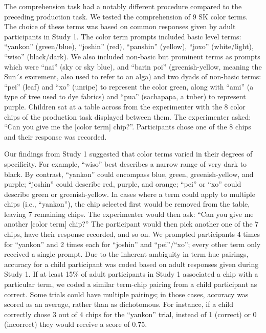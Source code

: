 \documentclass[
  ,apa7,floatsintext]{apa6}
\begin{document}
The comprehension task had a notably different procedure compared to the preceding production task. We tested the comprehension of 9 SK color terms. The choice of these terms was based on common responses given by adult participants in Study 1. The color term prompts included basic level terms: ``yankon'' (green/blue), ``joshin'' (red), ``panshin'' (yellow), ``joxo'' (white/light), ``wiso'' (black/dark). We also included non-basic but prominent terms as prompts which were ``nai'' (sky or sky blue), and ``barin poi'' (greenish-yellow, meaning the Sun´s excrement, also used to refer to an alga) and two dyads of non-basic terms: ``pei'' (leaf) and ``xo'' (unripe) to represent the color green, along with ``ami'' (a type of tree used to dye fabrics) and ``pua'' (sachapapa, a tuber) to represent purple. Children sat at a table across from the experimenter with the 8 color chips of the production task displayed between them. The experimenter asked: ``Can you give me the {[}color term{]} chip?''. Participants chose one of the 8 chips and their response was recorded.

Our findings from Study 1 suggested that color terms varied in their degrees of specificity. For example, ``wiso'' best describes a narrow range of very dark to black. By contrast, ``yankon'' could encompass blue, green, greenish-yellow, and purple; ``joshin'' could describe red, purple, and orange; ``pei'' or ``xo'' could describe green or greenish-yellow. In cases where a term could apply to multiple chips (i.e., ``yankon''), the chip selected first would be removed from the table, leaving 7 remaining chips. The experimenter would then ask: ``Can you give me another {[}color term{]} chip?'' The participant would then pick another one of the 7 chips, have their response recorded, and so on. We prompted participants 4 times for ``yankon'' and 2 times each for ``joshin'' and ``pei''/``xo''; every other term only received a single prompt. Due to the inherent ambiguity in term-hue pairings, accuracy for a child participant was coded based on adult responses given during Study 1. If at least 15\% of adult participants in Study 1 associated a chip with a particular term, we coded a similar term-chip pairing from a child participant as correct. Some trials could have multiple pairings; in those cases, accuracy was scored as an average, rather than as dichotomous. For instance, if a child correctly chose 3 out of 4 chips for the ``yankon'' trial, instead of 1 (correct) or 0 (incorrect) they would receive a score of 0.75.
\end{document}
